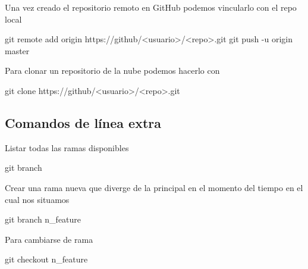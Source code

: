 \documentclass[
  letterpaper,
  DIV=11,
  numbers=noendperiod]{scrartcl}
\newenvironment{Shaded}{\begin{snugshade}}{\end{snugshade}}
\newcommand{\FunctionTok}[1]{\textcolor[rgb]{0.28,0.35,0.67}{#1}}
\newcommand{\NormalTok}[1]{\textcolor[rgb]{0.00,0.23,0.31}{#1}}
\newcommand{\OperatorTok}[1]{\textcolor[rgb]{0.37,0.37,0.37}{#1}}
\begin{document}
Una vez creado el repositorio remoto en GitHub podemos vincularlo con el
repo local

\begin{Shaded}
\begin{Highlighting}[]
\NormalTok{git remote add origin https}\OperatorTok{://}\NormalTok{github}\OperatorTok{/\textless{}}\NormalTok{usuario}\OperatorTok{\textgreater{}/\textless{}}\NormalTok{repo}\OperatorTok{\textgreater{}.}\FunctionTok{git}
\NormalTok{git push }\OperatorTok{{-}}\NormalTok{u origin master}
\end{Highlighting}
\end{Shaded}

Para clonar un repositorio de la nube podemos hacerlo con

\begin{Shaded}
\begin{Highlighting}[]
\NormalTok{git clone https}\OperatorTok{://}\NormalTok{github}\OperatorTok{/\textless{}}\NormalTok{usuario}\OperatorTok{\textgreater{}/\textless{}}\NormalTok{repo}\OperatorTok{\textgreater{}.}\FunctionTok{git}
\end{Highlighting}
\end{Shaded}

\subsection{Comandos de línea extra}\label{comandos-de-luxednea-extra}

Listar todas las ramas disponibles

\begin{Shaded}
\begin{Highlighting}[]
\NormalTok{git branch}
\end{Highlighting}
\end{Shaded}

Crear una rama nueva que diverge de la principal en el momento del
tiempo en el cual nos situamos

\begin{Shaded}
\begin{Highlighting}[]
\NormalTok{git branch n\_feature}
\end{Highlighting}
\end{Shaded}

Para cambiarse de rama

\begin{Shaded}
\begin{Highlighting}[]
\NormalTok{git checkout n\_feature}
\end{Highlighting}
\end{Shaded}
\end{document}
